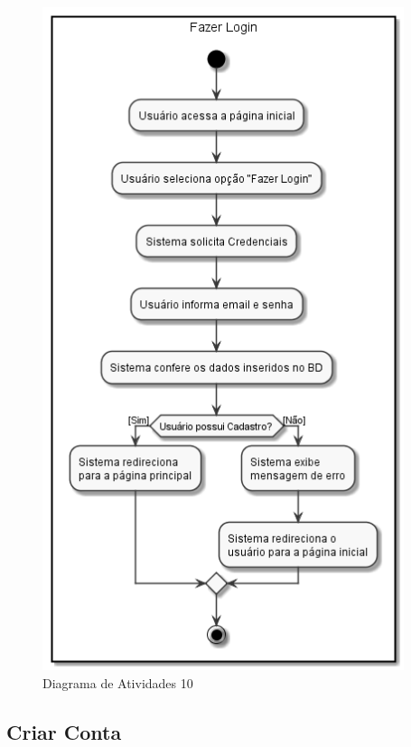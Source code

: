 \documentclass[rascunho,xindy,acronym,symbols]{fei}
\begin{document}
\begin{figure}[H]
    \centering
    \includegraphics[scale=0.6, width=300pt]{./Images/Fazer_Login.png}
    \caption{Diagrama de Atividades 10}
    \label{fig:diag_atv10}
\end{figure}

\subsection{Criar Conta}
\end{document}
